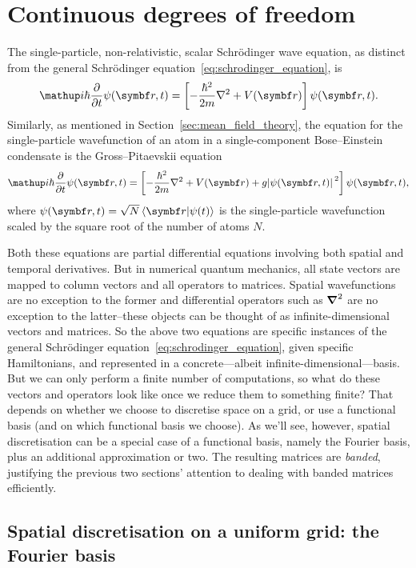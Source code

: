 \section{Continuous degrees of freedom}\label{sec:continuous_dof}
The single-particle, non-relativistic, scalar Schr\"odinger wave equation, as distinct from the general Schr\"odinger equation~\eqref{eq:schrodinger_equation}, is
\begin{align}\label{eq:schrodinger_wave_equation}
\ii\hbar\pdv{}{t}\psi(\vec r, t) = \left[-\frac{\hbar^2}{2m} \nabla^2 + V(\vec r)\right]\psi(\vec r, t).
\end{align}
Similarly, as mentioned in Section~\ref{sec:mean_field_theory}, the equation for the single-particle wavefunction of an atom in a single-component Bose--Einstein condensate is the Gross--Pitaevskii equation
\begin{align}
\ii\hbar\pdv{}{t}\psi(\vec r, t) = \left[-\frac{\hbar^2}{2m} \nabla^2 + V(\vec r) + g\abs{\psi(\vec r, t)}^2\right]\psi(\vec r, t),
\end{align}
where $\psi(\vec r, t) = \sqrt{N}\braket{\vec r}{\psi(t)}$ is the single-particle wavefunction scaled by the square root of the number of atoms $N$.

Both these equations are partial differential equations involving both spatial and temporal derivatives. But in numerical quantum mechanics, all state vectors are mapped to column vectors and all operators to matrices. Spatial wavefunctions are no exception to the former and differential operators such as $\grad^2$ are no exception to the latter--these objects can be thought of as infinite-dimensional vectors and matrices. So the above two equations are specific instances of the general Schr\"odinger equation~\eqref{eq:schrodinger_equation}, given specific Hamiltonians, and represented in a concrete---albeit infinite-dimensional---basis. But we can only perform a finite number of computations, so what do these vectors and operators look like once we reduce them to something finite? That depends on whether we choose to discretise space on a grid, or use a functional basis (and on which functional basis we choose). As we'll see, however, spatial discretisation can be a special case of a functional basis, namely the Fourier basis, plus an additional approximation or two. The resulting matrices are \emph{banded}, justifying the previous two sections' attention to dealing with banded matrices efficiently.

\subsection{Spatial discretisation on a uniform grid: the Fourier basis}

